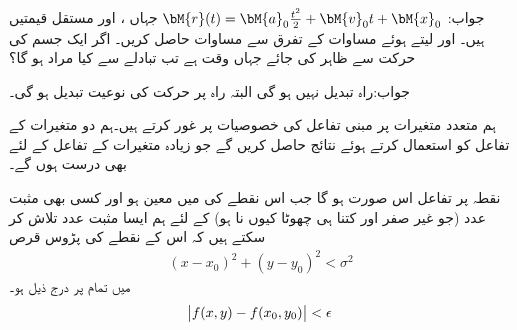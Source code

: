 جواب:
$\bM{r}(t)=\bM{a}_0\tfrac{t^2}{2}+\bM{v}_0t+\bM{x}_0$
جہاں ،  اور  مستقل قیمتیں ہیں۔
 اور  لیتے ہوئے مساوات  کے تفرق  سے مساوات  حاصل کریں۔
اگر ایک جسم کی حرکت  سے ظاہر کی جائے جہاں  وقت ہے تب  تبادلے سے کیا مراد ہو گا؟

جواب:راہ تبدیل نہیں ہو گی البتہ راہ پر حرکت کی نوعیت تبدیل ہو گی۔

ہم متعدد متغیرات پر مبنی تفاعل کی خصوصیات پر غور کرتے ہیں۔ہم دو متغیرات کے تفاعل کو استعمال کرتے ہوئے  نتائج حاصل کریں گے جو زیادہ متغیرات کے تفاعل کے لئے بھی درست ہوں گے۔

نقطہ  پر تفاعل   اس صورت  ہو گا جب اس نقطے کی  میں  معین ہو اور کسی بھی مثبت عدد  (جو غیر صفر اور کتنا ہی چھوٹا کیوں نا ہو) کے لئے ہم ایسا مثبت عدد  تلاش کر سکتے ہیں کہ اس کے نقطے کی پڑوس  قرص 
\begin{align}
(x-x_0)^2+(y-y_0)^2<\sigma^2
\end{align}
میں تمام  پر درج ذیل ہو۔
\begin{align}
\abs{f(x,y)-f(x_0,y_0)}<\epsilon
\end{align}


